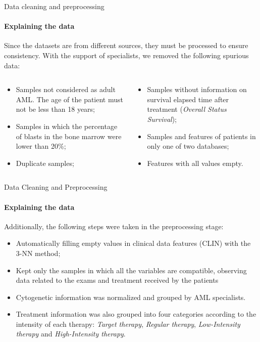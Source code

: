 \begin{frame}{Data cleaning and preprocessing}
\framesubtitle{Explaining the data}

Since the datasets are from different sources, they must be processed to ensure consistency.  With the support of specialists, we removed the following spurious data:

\begin{columns}
    \begin{column}{0.5\textwidth}
    \begin{itemize}
     \item Samples not considered as adult AML. The age of the patient must not be less than 18 years;
    \item Samples in which the percentage of blasts in the bone marrow were lower than 20\%;
    \item Duplicate samples;
    \end{itemize}
    \end{column}

    \begin{column}{0.5\textwidth}
    \begin{itemize}
        \item Samples without information on survival elapsed time after treatment (\textit{Overall Status Survival});
        \item Samples and features of patients in only one of two databases;
        \item Features with all values empty.
    \end{itemize}
\end{column}    
\end{columns}
    
\end{frame}


\begin{frame}{Data Cleaning and Preprocessing}
\framesubtitle{Explaining the data}

Additionally, the following steps were taken in the preprocessing stage:

\begin{itemize}
    \item Automatically filling empty values in clinical data features (CLIN) with the 3-NN method;
    \item Kept only the samples in which all the variables are compatible, observing data related to the exams and treatment received by the patients
    \item Cytogenetic information was normalized and grouped by AML specialists.
    \item Treatment information was also grouped  into four categories according to the intensity of each therapy: \emph{Target therapy}, \emph{Regular therapy}, \emph{Low-Intensity therapy} and \emph{High-Intensity therapy}.
\end{itemize}

    
\end{frame}

